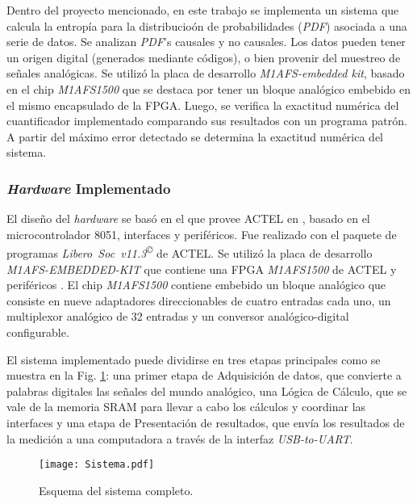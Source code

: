 Dentro del proyecto mencionado, en este trabajo se implementa un sistema que calcula la entropía para la distribucio\'on de probabilidades (\emph{PDF}) asociada a una serie de datos.
Se analizan \emph{PDF}'s causales y no causales.
Los datos pueden tener un origen digital (generados mediante códigos), o bien provenir del muestreo de señales analógicas.
Se utilizó la placa de desarrollo \textit{M1AFS-embedded kit}, basado en el chip \textit{M1AFS1500} que se destaca por tener un bloque analógico embebido en el mismo encapsulado de la FPGA.
Luego, se verifica la exactitud numérica del cuantificador implementado comparando sus resultados con un programa patrón. A partir del máximo error detectado se determina la exactitud numérica del sistema.

\subsubsection{\textit{Hardware} Implementado}
\label{sec:Hardware}

El diseño del \textit{hardware} se basó en el que provee ACTEL en \cite{Core8051sH}, basado en el microcontrolador 8051, interfaces y periféricos.
Fue realizado con el paquete de programas \textit{Libero~Soc~v11.3\textsuperscript\copyright} de ACTEL.
Se utilizó la placa de desarrollo \textit{M1AFS-EMBEDDED-KIT} que contiene una FPGA \textit{M1AFS1500} de ACTEL y periféricos \cite{actelM1AFS1500}.
El chip \textit{M1AFS1500} contiene embebido un bloque analógico que consiste en nueve adaptadores direccionables de cuatro entradas cada uno, un multiplexor analógico de 32 entradas y un conversor analógico-digital configurable.

El sistema implementado puede dividirse en tres etapas principales como se muestra en la Fig. \ref{Fig:Sistema}: una primer etapa de Adquisición de datos, que convierte a palabras digitales las señales del mundo analógico, una Lógica de Cálculo, que se vale de la memoria SRAM para llevar a cabo los cálculos y coordinar las interfaces y una etapa de Presentación de resultados, que envía los resultados de la medición a una computadora a través de la interfaz \textit{USB-to-UART}.
%
\begin{figure}
	\centering
	\texttt{[image: Sistema.pdf]}\\
	\caption{Esquema del sistema completo.}\label{Fig:Sistema}
\end{figure}

